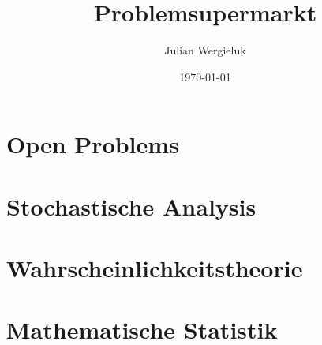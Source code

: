 \documentclass[12pt,oldfontcommands,oneside,a4paper,article]{memoir}
\title{Problemsupermarkt}\author{Julian Wergieluk}\date{\today}
\begin{document}
\pagestyle{headings}

\maketitle
\tableofcontents


\setcounter{secnumdepth}{4}
\renewcommand{\theparagraph}{\arabic{chapter}.\arabic{paragraph}}
\renewcommand{\theenumi}{\Alph{enumi}.}
\renewcommand{\labelenumi}{\theenumi}


\chapter{Open Problems}



\chapter{Stochastische Analysis}



\chapter{Wahrscheinlichkeitstheorie}



\chapter{Mathematische Statistik}












\backmatter

\printbibliography
%
%
\end{document}
